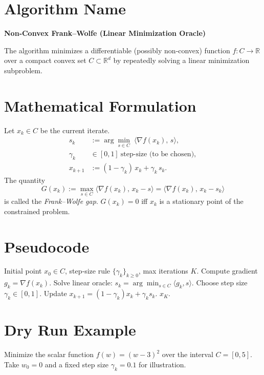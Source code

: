 \documentclass{article}
\begin{document}
\section*{Algorithm Name}
\textbf{Non‑Convex Frank–Wolfe (Linear Minimization Oracle)}  

The algorithm minimizes a differentiable (possibly non‑convex) function  
\(f:C\rightarrow\mathbb{R}\) over a compact convex set \(C\subset\mathbb{R}^{d}\)  
by repeatedly solving a linear minimization subproblem.

\section*{Mathematical Formulation}
Let \(x_{k}\in C\) be the current iterate.  
\[
\begin{aligned}
s_{k}&:=\arg\min_{s\in C}\;\langle \nabla f(x_{k}),\,s\rangle ,\tag{1}\\[4pt]
\gamma_{k}&\in[0,1]\ \text{step‑size (to be chosen)},\\[4pt]
x_{k+1}&:=(1-\gamma_{k})\,x_{k}+\gamma_{k}\,s_{k}. \tag{2}
\end{aligned}
\]
The quantity  
\[
G(x_{k}):=\max_{s\in C}\langle \nabla f(x_{k}),\,x_{k}-s\rangle
       =\langle \nabla f(x_{k}),\,x_{k}-s_{k}\rangle
\]
is called the \emph{Frank–Wolfe gap}.  \(G(x_{k})=0\) iff \(x_{k}\) is a stationary point of the constrained problem.

\section*{Pseudocode}
\begin{algorithm}[H]
\caption{Non‑Convex Frank–Wolfe}
\begin{algorithmic}[1]
\REQUIRE Initial point \(x_{0}\in C\), step‑size rule \(\{\gamma_{k}\}_{k\ge0}\), max iterations \(K\).
    \STATE Compute gradient \(g_{k}= \nabla f(x_{k})\).
    \STATE Solve linear oracle: \(s_{k}= \arg\min_{s\in C}\langle g_{k},s\rangle\).   
    \STATE Choose step size \(\gamma_{k}\in[0,1]\).                       
    \STATE Update \(x_{k+1}= (1-\gamma_{k})x_{k}+\gamma_{k}s_{k}\).        
\ENDFOR
\RETURN \(x_{K}\).
\end{algorithmic}
\end{algorithm}

\section*{Dry Run Example}
Minimize the scalar function \(f(w)=(w-3)^{2}\) over the interval \(C=[0,5]\).  
Take \(w_{0}=0\) and a fixed step size \(\gamma_{k}=0.1\) for illustration.
\end{document}
